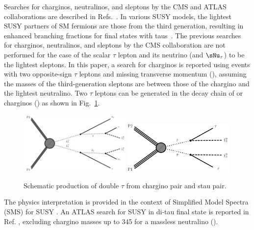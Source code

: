 Searches for charginos, neutralinos, and sleptons by the CMS and ATLAS collaborations are described in Refs.~\cite{Khachatryan:2014qwa,Khachatryan:2014mma,Khachatryan:2015kxa,Aad:2014nua,Aad:2014vma}.
In various SUSY models, the lightest SUSY partners of SM fermions are those from the third generation, 
resulting in enhanced branching fractions for final states with taus~\cite{Martin:1997ns}.  
The previous searches for charginos, neutralinos,
and sleptons by the CMS collaboration \cite{Khachatryan:2014qwa} are not performed for the case of 
the scalar $\tau$ lepton and its neutrino (\stau and $\sNu_\tau$) 
to be the lightest sleptons. In this paper, a search for charginos is reported using events 
with two opposite-sign $\tau$ leptons and 
missing transverse momentum (\MPT), assuming the masses of the third-generation sleptons are between those of the 
chargino and the lightest neutralino. 
Two $\tau$ leptons can be generated in the decay chain of \sTau 
or charginos (\PSGcpDo) as shown in Fig.~\ref{fig:Productions}. 
\begin{figure}[!htb]
\centering
\includegraphics[width=0.49\textwidth]{Introductionfigs/TChipmSlepSnu.pdf}
\includegraphics[width=0.49\textwidth]{Introductionfigs/TSlepSlep.pdf}
\caption{Schematic production of double $\tau$ from chargino pair and stau pair.}
\label{fig:Productions}
\end{figure}
The physics interpretation is provided in the context of Simplified Model Spectra (SMS) for SUSY \cite{Alwall:2008ag,alves:sms}.
An ATLAS search for SUSY in di-tau final state is reported in Ref. \cite{Aad:2014yka}, excluding chargino masses up to 345 \GeV 
for a massless neutralino (\PSGczDo).

